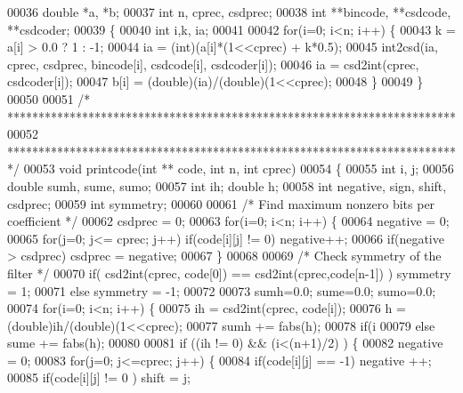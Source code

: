 \begin{DoxyCode}
00036 double *a, *b;
00037 \textcolor{keywordtype}{int} n, cprec, csdprec;
00038 \textcolor{keywordtype}{int} **bincode, **csdcode, **csdcoder;
00039 \{
00040     \textcolor{keywordtype}{int} i,k, ia;
00041 
00042     \textcolor{keywordflow}{for}(i=0; i<n; i++) \{
00043         k = a[i] > 0.0 ? 1 : -1;
00044         ia = (int)(a[i]*(1<<cprec) + k*0.5);
00045         int2csd(ia, cprec, csdprec, bincode[i], csdcode[i], csdcoder[i]);
00046         ia = csd2int(cprec, csdcoder[i]);
00047         b[i] = (double)(ia)/(double)(1<<cprec);
00048     \}
00049 \}
00050 
00051 \textcolor{comment}{/* ************************************************************************ }
00052 \textcolor{comment}{   ************************************************************************ */}
00053 \textcolor{keywordtype}{void} printcode(\textcolor{keywordtype}{int} ** code, \textcolor{keywordtype}{int} n, \textcolor{keywordtype}{int} cprec)
00054 \{
00055     \textcolor{keywordtype}{int} i, j;
00056     \textcolor{keywordtype}{double} sumh, sume, sumo;
00057     \textcolor{keywordtype}{int} ih; \textcolor{keywordtype}{double} h;
00058     \textcolor{keywordtype}{int} negative, sign, shift, csdprec;
00059     \textcolor{keywordtype}{int} symmetry;
00060 
00061     \textcolor{comment}{/* Find maximum nonzero bits per coefficient */}
00062     csdprec = 0;
00063     \textcolor{keywordflow}{for}(i=0; i<n; i++) \{
00064         negative = 0;
00065         \textcolor{keywordflow}{for}(j=0; j<= cprec; j++) \textcolor{keywordflow}{if}(code[i][j] != 0) negative++;
00066         \textcolor{keywordflow}{if}(negative > csdprec) csdprec = negative;
00067     \}
00068 
00069     \textcolor{comment}{/* Check symmetry of the filter */}
00070     \textcolor{keywordflow}{if}( csd2int(cprec, code[0]) == csd2int(cprec,code[n-1]) ) symmetry = 1;
00071     \textcolor{keywordflow}{else} symmetry = -1;
00072 
00073     sumh=0.0; sume=0.0; sumo=0.0;
00074     \textcolor{keywordflow}{for}(i=0; i<n; i++) \{
00075         ih = csd2int(cprec, code[i]);
00076         h = (double)ih/(\textcolor{keywordtype}{double})(1<<cprec);
00077         sumh += fabs(h);
00078         \textcolor{keywordflow}{if}(i%
00079         \textcolor{keywordflow}{else} sume += fabs(h);
00080 
00081         \textcolor{keywordflow}{if} ((ih != 0) && (i<(n+1)/2) ) \{
00082             negative = 0;
00083             \textcolor{keywordflow}{for}(j=0; j<=cprec; j++) \{
00084                 \textcolor{keywordflow}{if}(code[i][j] == -1) negative ++;
00085                 \textcolor{keywordflow}{if}(code[i][j] != 0 ) shift = j;

\end{DoxyCode}
